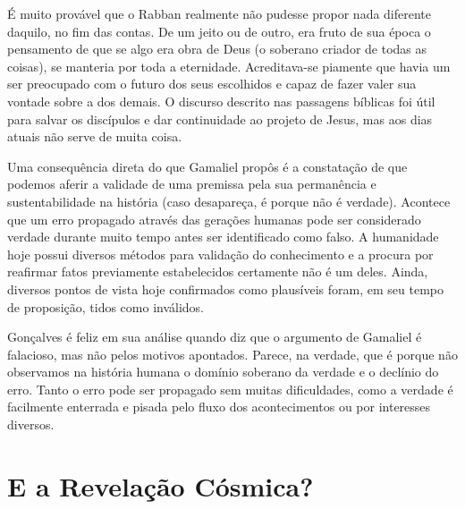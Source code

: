 \documentclass[12pt, oneside,twocolumns, a4paper, brazil]{abntex2}
\begin{document}
É muito provável que o Rabban realmente não pudesse propor nada diferente daquilo, no fim das contas. De um jeito ou de outro, era fruto de sua época o pensamento de que se algo era obra de Deus (o soberano criador de todas as coisas), se manteria por toda a eternidade. Acreditava-se piamente que havia um ser preocupado com o futuro dos seus escolhidos e capaz de fazer valer sua vontade sobre a dos demais. O discurso descrito nas passagens bíblicas foi útil para salvar os discípulos e dar continuidade ao projeto de Jesus, mas aos dias atuais não serve de muita coisa. \par
Uma consequência direta do que Gamaliel propôs é a constatação de que podemos aferir a validade de uma premissa pela sua permanência e sustentabilidade na história (caso desapareça, é porque não é verdade). Acontece que um erro propagado através das gerações humanas pode ser considerado verdade durante muito tempo antes ser identificado como falso. A humanidade hoje possui diversos métodos para validação do conhecimento e a procura por reafirmar fatos previamente estabelecidos certamente não é um deles. Ainda, diversos pontos de vista hoje confirmados como plausíveis foram, em seu tempo de proposição, tidos como inválidos.\par
Gonçalves é feliz em sua análise quando diz que o argumento de Gamaliel é falacioso, mas não pelos motivos apontados. Parece, na verdade, que é porque não observamos na história humana o domínio soberano da verdade e o declínio do erro. Tanto o erro pode ser propagado sem muitas dificuldades, como a verdade é facilmente enterrada e pisada pelo fluxo dos acontecimentos ou por interesses diversos.

\section*{E a Revelação Cósmica?}
\end{document}
